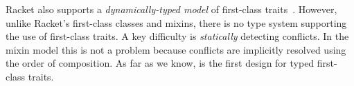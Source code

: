 Racket also supports a \emph{dynamically-typed model} of first-class
traits~\citep{DBLP:conf/aplas/FlattFF06}. However, unlike Racket's first-class
classes and mixins, there is no type system supporting the use of first-class
traits. A key difficulty is \emph{statically} detecting conflicts. In the mixin
model this is not a problem because conflicts are implicitly resolved using the
order of composition. As far as we know, \sedel is the first design for typed
first-class traits.






